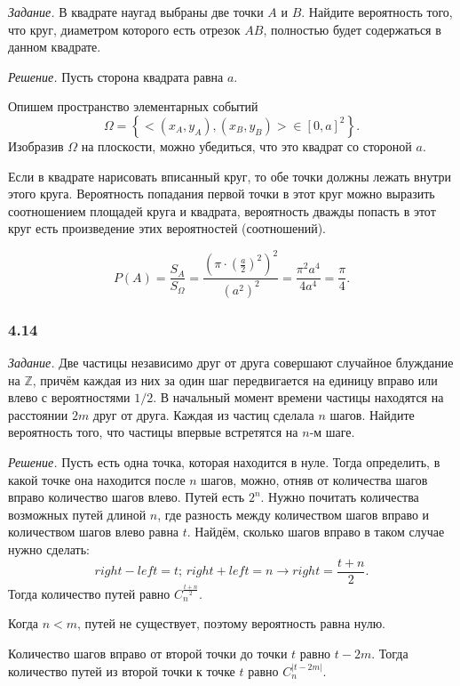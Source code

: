 \textit{Задание.} В квадрате наугад выбраны две точки $A$ и $B$.
Найдите вероятность того, что круг, диаметром которого есть отрезок $AB$, полностью будет содержаться в данном квадрате.

\textit{Решение.} Пусть сторона квадрата равна $a$.

Опишем пространство элементарных событий
$$ \Omega =
\left\{ < \left( x_A, y_A \right), \left( x_B, y_B \right) > \in \left[ 0, a \right]^2 \right\}.$$
Изобразив $ \Omega $ на плоскости, можно убедиться, что это квадрат со стороной $a$.

Если в квадрате нарисовать вписанный круг, то обе точки должны лежать внутри этого круга.
Вероятность попадания первой точки в этот круг можно выразить соотношением площадей круга и квадрата,
вероятность дважды попасть в этот круг есть произведение этих вероятностей (соотношений).

$$P \left( A \right) =
\frac{S_A}{S_{ \Omega }} =
\frac{ \left( \pi \cdot \left( \frac{a}{2} \right)^2 \right)^2}{ \left( a^2 \right)^2} =
\frac{ \pi^2 a^4}{4a^4} =
\frac{ \pi }{4}.$$

\subsubsection*{4.14}

\textit{Задание.}
Две частицы независимо друг от друга совершают случайное блуждание на $ \mathbb{Z} $,
причём каждая из них за один шаг передвигается на единицу вправо или влево с вероятностями $1/2$.
В начальный момент времени частицы находятся на расстоянии $2m$ друг от друга.
Каждая из частиц сделала $n$ шагов.
Найдите вероятность того, что частицы впервые встретятся на $n$-м шаге.

\textit{Решение.} Пусть есть одна точка, которая находится в нуле.
Тогда определить, в какой точке она находится после $n$ шагов, можно, отняв от количества шагов вправо количество шагов влево.
Путей есть $2^n$.
Нужно почитать количества возможных путей длиной $n$, где разность между количеством шагов вправо и количеством шагов влево равна $t$.
Найдём, сколько шагов вправо в таком случае нужно сделать:
$$right - left = t; \, right + left = n \rightarrow right = \frac{t+n}{2}.$$
Тогда количество путей равно $C_n^{ \frac{t+n}{2} }$.

Когда $n < m$, путей не существует, поэтому вероятность равна нулю.

Количество шагов вправо от второй точки до точки $t$ равно $t - 2m$.
Тогда количество путей из второй точки к точке $t$ равно $C_n^{ \left| t-2m \right| }$.

